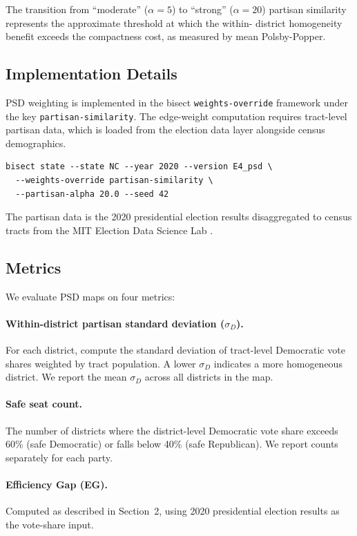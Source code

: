 The transition from ``moderate'' ($\alpha = 5$) to ``strong'' ($\alpha = 20$)
partisan similarity represents the approximate threshold at which the within-
district homogeneity benefit exceeds the compactness cost, as measured by
mean Polsby-Popper.

\subsection{Implementation Details}

PSD weighting is implemented in the bisect \texttt{weights-override} framework
under the key \texttt{partisan-similarity}.  The edge-weight computation
requires tract-level partisan data, which is loaded from the election data
layer alongside census demographics.

\begin{verbatim}
bisect state --state NC --year 2020 --version E4_psd \
  --weights-override partisan-similarity \
  --partisan-alpha 20.0 --seed 42
\end{verbatim}

The partisan data is the 2020 presidential election results disaggregated to
census tracts from the MIT Election Data Science Lab \citep{MEDSL2020}.

\subsection{Metrics}

We evaluate PSD maps on four metrics:

\paragraph{Within-district partisan standard deviation ($\sigma_D$).}
For each district, compute the standard deviation of tract-level Democratic
vote shares weighted by tract population.  A lower $\sigma_D$ indicates a
more homogeneous district.  We report the mean $\sigma_D$ across all districts
in the map.

\paragraph{Safe seat count.}
The number of districts where the district-level Democratic vote share exceeds
60\% (safe Democratic) or falls below 40\% (safe Republican).  We report
counts separately for each party.

\paragraph{Efficiency Gap (EG).}
Computed as described in Section~2, using 2020 presidential election results
as the vote-share input.

